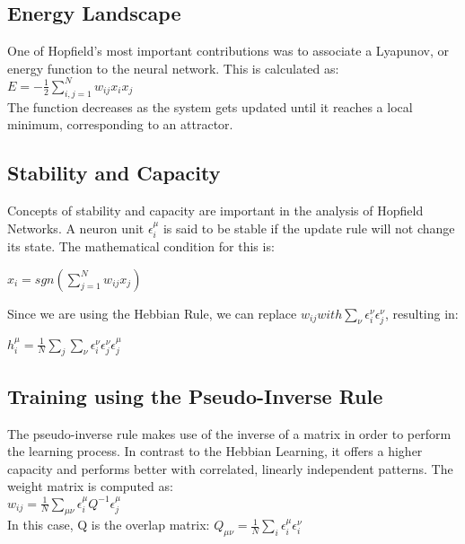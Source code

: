 \subsection{Energy Landscape}

One of Hopfield's most important contributions was to associate a Lyapunov, or energy function to the neural network. This is calculated as:\\

\( E = -\frac{1}{2} \sum_{i,j=1}^{N}w_{ij}x_{i}x_{j} \)\\

The function decreases as the system gets updated until it reaches a local minimum, corresponding to an attractor. 

\subsection{Stability and Capacity}

Concepts of stability and capacity are important in the analysis of Hopfield Networks. A neuron unit \( \epsilon_{i}^{\mu}\) is said to be stable if the update rule will not change its state. The mathematical condition for this is:

 \(x_{i} = sgn(\sum_{j=1}^{N}w_{ij}x_{j}) \)

Since we are using the Hebbian Rule, we can replace \(w_{ij} with \sum_{\nu}\epsilon_{i}^{\nu}\epsilon_{j}^{\nu}\), resulting in:

\( h_{i}^{\mu} = \frac{1}{N}\sum_{j} \sum_{\nu} \epsilon_{i}^{\nu}
						 \epsilon_{j}^{\nu}
						 \epsilon_{j}^{\mu}\)
 
\subsection{Training using the Pseudo-Inverse Rule}

The pseudo-inverse rule makes use of the inverse of a matrix in order to perform the learning process. In contrast to the Hebbian Learning, it offers a higher capacity and performs better with correlated, linearly independent patterns. The weight matrix is computed as:\\

\( w_{ij} = \frac{1}{N} \sum_{\mu\nu}\epsilon_{i}^\mu Q^{-1} \epsilon_{j}^\mu \)\\

In this case, Q is the overlap matrix:
\(  Q_{\mu\nu} = \frac{1}{N}\sum_{i}\epsilon_{i}^\mu \epsilon_{i}^\nu \)

